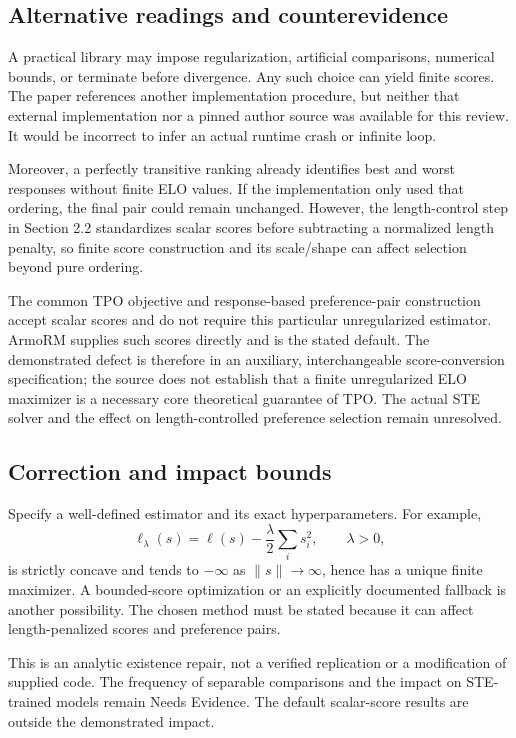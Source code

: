 \documentclass[10pt]{article}
\begin{document}
\subsection*{Alternative readings and counterevidence}
A practical library may impose regularization, artificial comparisons, numerical bounds, or terminate before divergence. Any such choice can yield finite scores. The paper references another implementation procedure, but neither that external implementation nor a pinned author source was available for this review. It would be incorrect to infer an actual runtime crash or infinite loop.\par
Moreover, a perfectly transitive ranking already identifies best and worst responses without finite ELO values. If the implementation only used that ordering, the final pair could remain unchanged. However, the length-control step in Section 2.2 standardizes scalar scores before subtracting a normalized length penalty, so finite score construction and its scale/shape can affect selection beyond pure ordering.\par
The common TPO objective and response-based preference-pair construction accept scalar scores and do not require this particular unregularized estimator. ArmoRM supplies such scores directly and is the stated default. The demonstrated defect is therefore in an auxiliary, interchangeable score-conversion specification; the source does not establish that a finite unregularized ELO maximizer is a necessary core theoretical guarantee of TPO. The actual STE solver and the effect on length-controlled preference selection remain unresolved.\par
\subsection*{Correction and impact bounds}
Specify a well-defined estimator and its exact hyperparameters. For example, \[\ell_\lambda(s)=\ell(s)-\frac{\lambda}{2}\sum_i s_i^2,\qquad \lambda>0,\] is strictly concave and tends to \(-\infty\) as \(\|s\|\to\infty\), hence has a unique finite maximizer. A bounded-score optimization or an explicitly documented fallback is another possibility. The chosen method must be stated because it can affect length-penalized scores and preference pairs.\par
This is an analytic existence repair, not a verified replication or a modification of supplied code. The frequency of separable comparisons and the impact on STE-trained models remain Needs Evidence. The default scalar-score results are outside the demonstrated impact.\par
\end{document}
